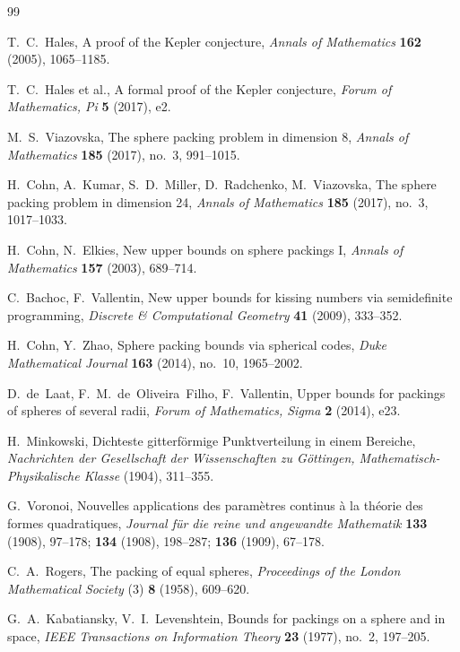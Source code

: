 \documentclass[11pt]{article}
\theoremstyle{remark}
\theoremstyle{definition}
\begin{document}
\begin{thebibliography}{99}\itemsep -1pt

T.~C.~Hales,
A proof of the Kepler conjecture,
\emph{Annals of Mathematics} \textbf{162} (2005), 1065--1185.

T.~C.~Hales et al.,
A formal proof of the Kepler conjecture,
\emph{Forum of Mathematics, Pi} \textbf{5} (2017), e2.

M.~S.~Viazovska,
The sphere packing problem in dimension 8,
\emph{Annals of Mathematics} \textbf{185} (2017), no.~3, 991--1015.

H.~Cohn, A.~Kumar, S.~D.~Miller, D.~Radchenko, M.~Viazovska,
The sphere packing problem in dimension 24,
\emph{Annals of Mathematics} \textbf{185} (2017), no.~3, 1017--1033.

H.~Cohn, N.~Elkies,
New upper bounds on sphere packings I,
\emph{Annals of Mathematics} \textbf{157} (2003), 689--714.

C.~Bachoc, F.~Vallentin,
New upper bounds for kissing numbers via semidefinite programming,
\emph{Discrete \& Computational Geometry} \textbf{41} (2009), 333--352.

H.~Cohn, Y.~Zhao,
Sphere packing bounds via spherical codes,
\emph{Duke Mathematical Journal} \textbf{163} (2014), no.~10, 1965--2002.

D.~de~Laat, F.~M.~de~Oliveira~Filho, F.~Vallentin,
Upper bounds for packings of spheres of several radii,
\emph{Forum of Mathematics, Sigma} \textbf{2} (2014), e23.

H.~Minkowski,
Dichteste gitterf\"ormige Punktverteilung in einem Bereiche,
\emph{Nachrichten der Gesellschaft der Wissenschaften zu G\"ottingen, Mathematisch-Physikalische Klasse} (1904), 311--355.

G.~Voronoi,
Nouvelles applications des param\`etres continus \`a la th\'eorie des formes quadratiques,
\emph{Journal f\"ur die reine und angewandte Mathematik} \textbf{133} (1908), 97--178; \textbf{134} (1908), 198--287; \textbf{136} (1909), 67--178.

C.~A.~Rogers,
The packing of equal spheres,
\emph{Proceedings of the London Mathematical Society} (3) \textbf{8} (1958), 609--620.

G.~A.~Kabatiansky, V.~I.~Levenshtein,
Bounds for packings on a sphere and in space,
\emph{IEEE Transactions on Information Theory} \textbf{23} (1977), no.~2, 197--205.


\end{thebibliography}
\end{document}
